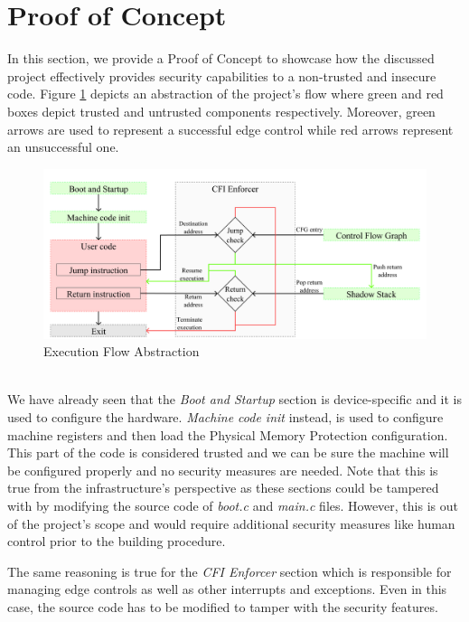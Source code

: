 \section{Proof of Concept}
\label{sec:project_poc}

In this section, we provide a Proof of Concept to showcase how the discussed
project effectively provides security capabilities to a non-trusted and insecure
code. Figure \ref{fig:functioning} depicts an abstraction of the project's flow where
green and red boxes depict trusted and untrusted components respectively.
Moreover, green arrows are used to represent a successful edge control while red
arrows represent an unsuccessful one. \\
\begin{figure}[htbp]
  \centering
  \includegraphics[width=.9\linewidth]{images/functioning.png}
  \caption{Execution Flow Abstraction}
  \label{fig:functioning}
\end{figure}
\\

We have already seen that the \textit{Boot and Startup} section is device-specific
and it is used to configure the hardware. \textit{Machine code init} instead, is
used to configure machine registers and then load the Physical Memory Protection
configuration. This part of the code is considered trusted and we can be sure
the machine will be configured properly and no security measures are needed. Note
that this is true from the infrastructure's perspective as these sections could be
tampered with by modifying the source code of \textit{boot.c} and \textit{main.c}
files. However, this is out of the project's scope and would require additional security
measures like human control prior to the building procedure.

The same reasoning is true for the \textit{CFI Enforcer} section which is
responsible for managing edge controls as well as other interrupts and
exceptions. Even in this case, the source code has to be modified to tamper with
the security features.

